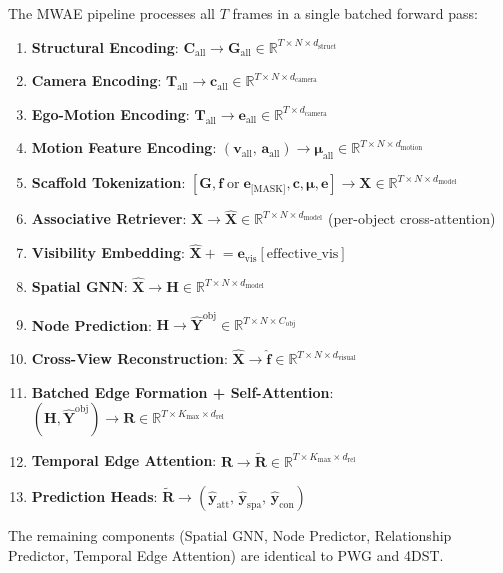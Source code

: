 \documentclass[runningheads]{llncs}
\newcommand{\mR}{\mathbb{R}}
\newcommand{\mat}[1]{\bm{#1}}
\begin{document}
The MWAE pipeline processes all $T$ frames in a single batched forward pass:
\begin{enumerate}
    \item \textbf{Structural Encoding}: $\mat{C}_{\text{all}} \to \mat{G}_{\text{all}} \in \mR^{T \times N \times d_{\text{struct}}}$
    \item \textbf{Camera Encoding}: $\mat{T}_{\text{all}} \to \mat{c}_{\text{all}} \in \mR^{T \times N \times d_{\text{camera}}}$
    \item \textbf{Ego-Motion Encoding}: $\mat{T}_{\text{all}} \to \mat{e}_{\text{all}} \in \mR^{T \times d_{\text{camera}}}$
    \item \textbf{Motion Feature Encoding}: $(\mat{v}_{\text{all}},\, \mat{a}_{\text{all}}) \to \mat{\mu}_{\text{all}} \in \mR^{T \times N \times d_{\text{motion}}}$
    \item \textbf{Scaffold Tokenization}: $[\mat{G}, \mat{f}\;\text{or}\;\mat{e}_{\text{[MASK]}}, \mat{c}, \mat{\mu}, \mat{e}] \to \mat{X} \in \mR^{T \times N \times d_{\text{model}}}$
    \item \textbf{Associative Retriever}: $\mat{X} \to \hat{\mat{X}} \in \mR^{T \times N \times d_{\text{model}}}$ \quad (per-object cross-attention)
    \item \textbf{Visibility Embedding}: $\hat{\mat{X}} \mathrel{+}= \mat{e}_{\text{vis}}[\text{effective\_vis}]$
    \item \textbf{Spatial GNN}: $\hat{\mat{X}} \to \mat{H} \in \mR^{T \times N \times d_{\text{model}}}$
    \item \textbf{Node Prediction}: $\mat{H} \to \hat{\mat{Y}}^{\text{obj}} \in \mR^{T \times N \times C_{\text{obj}}}$
    \item \textbf{Cross-View Reconstruction}: $\hat{\mat{X}} \to \hat{\mat{f}} \in \mR^{T \times N \times d_{\text{visual}}}$
    \item \textbf{Batched Edge Formation + Self-Attention}: $(\mat{H}, \hat{\mat{Y}}^{\text{obj}}) \to \mat{R} \in \mR^{T \times K_{\max} \times d_{\text{rel}}}$
    \item \textbf{Temporal Edge Attention}: $\mat{R} \to \tilde{\mat{R}} \in \mR^{T \times K_{\max} \times d_{\text{rel}}}$
    \item \textbf{Prediction Heads}: $\tilde{\mat{R}} \to (\hat{\mat{y}}_{\text{att}},\,\hat{\mat{y}}_{\text{spa}},\,\hat{\mat{y}}_{\text{con}})$
\end{enumerate}
The remaining components (Spatial GNN, Node Predictor, Relationship Predictor, Temporal Edge Attention) are identical to PWG and 4DST.
\end{document}
